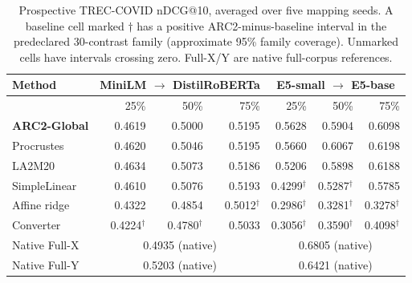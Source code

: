 \begin{table}[t]
\centering
\small
\setlength{\tabcolsep}{4pt}
\caption{Prospective TREC-COVID nDCG@10, averaged over five mapping seeds. A baseline cell marked $\dagger$ has a positive ARC2-minus-baseline interval in the predeclared 30-contrast family (approximate 95\% family coverage). Unmarked cells have intervals crossing zero. Full-X/Y are native full-corpus references.}\label{tab:trec}
\begin{tabular}{lrrrrrr}
\toprule
Method & \multicolumn{3}{c}{MiniLM $\rightarrow$ DistilRoBERTa} & \multicolumn{3}{c}{E5-small $\rightarrow$ E5-base} \\
\midrule
 & 25\% & 50\% & 75\% & 25\% & 50\% & 75\% \\
\textbf{ARC2-Global} & 0.4619 & 0.5000 & 0.5195 & 0.5628 & 0.5904 & 0.6098 \\
Procrustes & 0.4620 & 0.5046 & 0.5195 & 0.5660 & 0.6067 & 0.6198 \\
LA2M20 & 0.4634 & 0.5073 & 0.5186 & 0.5206 & 0.5898 & 0.6188 \\
SimpleLinear & 0.4610 & 0.5076 & 0.5193 & 0.4299$^{\dagger}$ & 0.5287$^{\dagger}$ & 0.5785 \\
Affine ridge & 0.4322 & 0.4854 & 0.5012$^{\dagger}$ & 0.2986$^{\dagger}$ & 0.3281$^{\dagger}$ & 0.3278$^{\dagger}$ \\
Converter & 0.4224$^{\dagger}$ & 0.4780$^{\dagger}$ & 0.5033 & 0.3056$^{\dagger}$ & 0.3590$^{\dagger}$ & 0.4098$^{\dagger}$ \\
Native Full-X & \multicolumn{3}{c}{0.4935 (native)} & \multicolumn{3}{c}{0.6805 (native)} \\
Native Full-Y & \multicolumn{3}{c}{0.5203 (native)} & \multicolumn{3}{c}{0.6421 (native)} \\
\bottomrule
\end{tabular}
\end{table}
